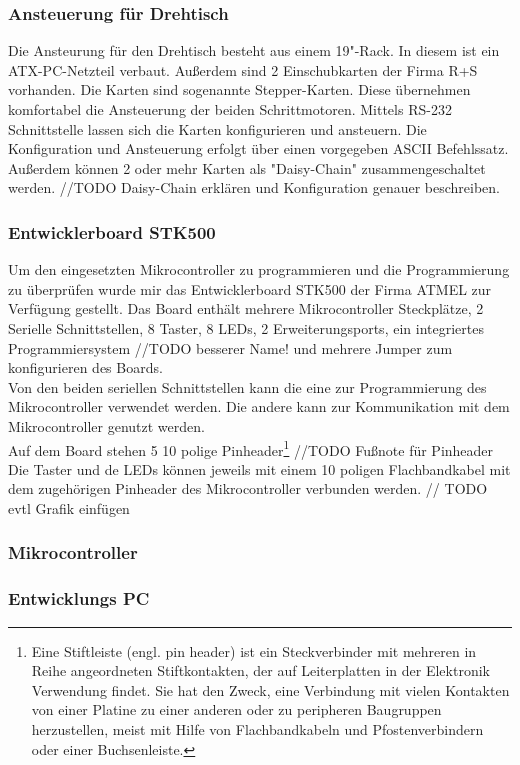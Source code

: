 \documentclass[11pt,twoside]{report}
\begin{document}
\subsubsection{Ansteuerung für Drehtisch}
Die Ansteurung für den Drehtisch besteht aus einem 19"-Rack. In diesem ist ein ATX-PC-Netzteil verbaut. Außerdem sind 2 Einschubkarten der Firma R+S vorhanden. Die Karten sind sogenannte Stepper-Karten. Diese übernehmen komfortabel die Ansteuerung der beiden Schrittmotoren. Mittels RS-232 Schnittstelle lassen sich die Karten konfigurieren und ansteuern. Die Konfiguration und Ansteuerung erfolgt über einen vorgegeben ASCII Befehlssatz. Außerdem können 2 oder mehr Karten als "Daisy-Chain" zusammengeschaltet werden. 
//TODO Daisy-Chain erklären und Konfiguration genauer beschreiben.
\subsubsection{Entwicklerboard STK500}
Um den eingesetzten Mikrocontroller zu programmieren und die Programmierung zu überprüfen wurde mir das Entwicklerboard STK500 der Firma ATMEL zur Verfügung gestellt. Das Board enthält mehrere Mikrocontroller Steckplätze, 2 Serielle Schnittstellen, 8 Taster, 8 LEDs, 2 Erweiterungsports, ein integriertes Programmiersystem //TODO besserer Name! und mehrere Jumper zum konfigurieren des Boards.\\
Von den beiden seriellen Schnittstellen kann die eine zur Programmierung des Mikrocontroller verwendet werden. Die andere kann zur Kommunikation mit dem Mikrocontroller genutzt werden.\\
Auf dem Board stehen 5 10 polige Pinheader\footnote{Eine Stiftleiste (engl. pin header) ist ein Steckverbinder mit mehreren in Reihe angeordneten Stiftkontakten, der auf Leiterplatten in der Elektronik Verwendung findet. Sie hat den Zweck, eine Verbindung mit vielen Kontakten von einer Platine zu einer anderen oder zu peripheren Baugruppen herzustellen, meist mit Hilfe von Flachbandkabeln und Pfostenverbindern oder einer Buchsenleiste. }  //TODO Fußnote für Pinheader 
Die Taster und de LEDs können jeweils mit einem 10 poligen Flachbandkabel mit dem zugehörigen Pinheader des Mikrocontroller verbunden werden. // TODO evtl Grafik einfügen 
\subsubsection{Mikrocontroller}

\subsubsection{Entwicklungs PC}
\end{document}
